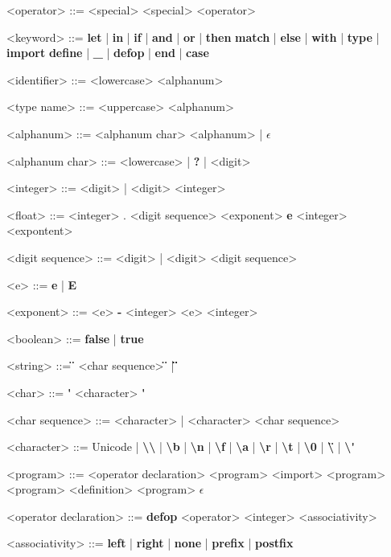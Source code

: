 \documentclass[12pt]{article}
\begin{document}
\begin{grammar}

<operator> ::= <special>
    \alt <special> <operator>

<keyword> ::= \textbf{let} | \textbf{in} | \textbf{if} | \textbf{and} 
    | \textbf{or} | \textbf{then}
    \alt \textbf{match} | \textbf{else} | \textbf{with} | \textbf{type} 
    | \textbf{import} \alt \textbf{define} | \textbf{_} | \textbf{defop} 
    | \textbf{end} | \textbf{case}

<identifier> ::= <lowercase> <alphanum>

<type name> ::= <uppercase> <alphanum>

<alphanum> ::= <alphanum char> <alphanum> | $\epsilon$

<alphanum char> ::= <lowercase> | \textbf{?} | <digit>

<integer> ::= <digit> | <digit> <integer>

<float> ::= <integer> . <digit sequence> <exponent> \textbf{e}
    \alt <integer> <expontent>

<digit sequence> ::= <digit> | <digit> <digit sequence>

<e> ::= \textbf{e} | \textbf{E}

<exponent> ::= <e> \textbf{-} <integer>
    \alt <e> <integer>

<boolean> ::= \textbf{false} | \textbf{true}

<string> ::= \textbf{\"} <char sequence> \textbf{\"} | \textbf{\"}\textbf{\"}

<char> ::= \textbf{\'} <character> \textbf{\'}

<char sequence> ::= <character> | <character> <char sequence>

<character> ::= Unicode
    | \textbf{\textbackslash\textbackslash}
    | \textbf{\textbackslash b}
    | \textbf{\textbackslash n}
    | \textbf{\textbackslash f}
    | \textbf{\textbackslash a}
    | \textbf{\textbackslash r}
    | \textbf{\textbackslash t}
    | \textbf{\textbackslash 0}
    | \textbf{\textbackslash \"}
    | \textbf{\textbackslash \'}

<program> ::= <operator declaration> <program>
    \alt <import> <program>
     <program>
    \alt <definition> <program>
    \alt $\epsilon$

<operator declaration> ::= \textbf{defop} <operator> <integer> <associativity>

<associativity> ::= \textbf{left} | \textbf{right} 
    | \textbf{none} | \textbf{prefix} | \textbf{postfix}


\end{grammar}
\end{document}
